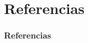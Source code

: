 \section{Referencias}
\begin{frame}[t, allowframebreaks]
\frametitle{Referencias}
\printbibliography[heading=none]
\end{frame}

